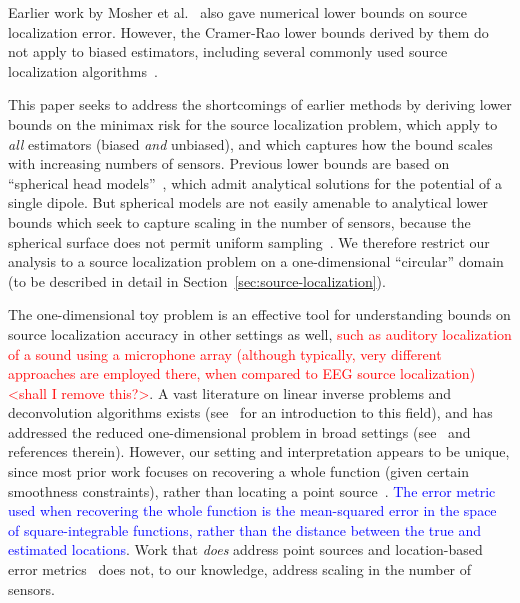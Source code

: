 \documentclass[conference]{IEEEtran}
\begin{document}
Earlier work by Mosher et al.~\cite{Mosher1993Error} also gave numerical lower
bounds on source localization error. However, the Cramer-Rao lower bounds
derived by them do not apply to biased estimators, including several commonly
used source localization
algorithms~\cite{Hamalainen1994Interpreting,Lin2006Assessing}.

This paper seeks to address the shortcomings of earlier methods by deriving
lower bounds on the minimax risk for the source localization problem, which
apply to \emph{all} estimators (biased \emph{and} unbiased), and which captures
how the bound scales with increasing numbers of sensors. Previous lower bounds
are based on ``spherical head
models''~\cite{Nunez2006Electric,Grover2016Information}, which admit analytical
solutions for the potential of a single dipole. But spherical models are not
easily amenable to analytical lower bounds which seek to capture scaling in the
number of sensors, because the spherical surface does not permit uniform
sampling~\cite{Heath1956Thirteen}. We therefore restrict our analysis to a
source localization problem on a one-dimensional ``circular'' domain (to be
described in detail in Section~\ref{sec:source-localization}).

The one-dimensional toy problem is an effective tool for understanding bounds
on source localization accuracy in other settings as well, \textcolor{red}{such
	as auditory localization of a sound using a microphone array (although
	typically, very different approaches are employed there, when compared to
EEG source localization) <shall I remove this?>}. A vast literature on linear
inverse problems and deconvolution algorithms exists
(see~\cite{Bal2012Introduction} for an introduction to this field), and has
addressed the reduced one-dimensional problem in broad settings
(see~\cite{Cavalier2002Sharp,Efromovich1997Robust,Ibragimov1981Statistical} and
references therein). However, our setting and interpretation appears to be
unique, since most prior work focuses on recovering a whole function (given
certain smoothness constraints), rather than locating a point
source~\cite{Cavalier2002Sharp}. \textcolor{blue}{The error metric used when
recovering the whole function is the mean-squared error in the space of
square-integrable functions, rather than the distance between the true and
estimated locations}. Work that \emph{does} address point sources and
location-based error metrics~\cite{Ibragimov1981Statistical} does not, to our
knowledge, address scaling in the number of sensors.
\end{document}
